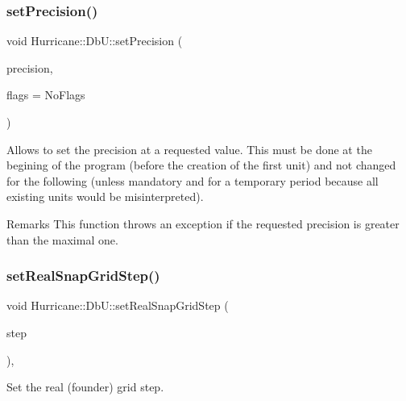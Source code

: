 \subsubsection{\texorpdfstring{set\+Precision()}{setPrecision()}}
{\footnotesize\ttfamily void Hurricane\+::\+Db\+U\+::set\+Precision (\begin{DoxyParamCaption}\item[{unsigned int}]{precision,  }\item[{unsigned int}]{flags = {\ttfamily NoFlags} }\end{DoxyParamCaption})\hspace{0.3cm}{\ttfamily [static]}}

Allows to set the precision at a requested value. This must be done at the begining of the program (before the creation of the first unit) and not changed for the following (unless mandatory and for a temporary period because all existing units would be misinterpreted).

\begin{DoxyRemark}{Remarks}
This function throws an exception if the requested precision is greater than the maximal one. 
\end{DoxyRemark}
\mbox{\label{group__DbUGroup_ga202cc3aa3364c2224647a29dde047fae}} 
\subsubsection{\texorpdfstring{set\+Real\+Snap\+Grid\+Step()}{setRealSnapGridStep()}}
{\footnotesize\ttfamily void Hurricane\+::\+Db\+U\+::set\+Real\+Snap\+Grid\+Step (\begin{DoxyParamCaption}\item[{\mbox{\hyperlink{group__DbUGroup_ga4fbfa3e8c89347af76c9628ea06c4146}{Db\+U\+::\+Unit}}}]{step }\end{DoxyParamCaption})\hspace{0.3cm}{\ttfamily [inline]}, {\ttfamily [static]}}

Set the real (founder) grid step. \mbox{\label{group__DbUGroup_ga09e46fcca6aaca94851adfa196e10170}} 
